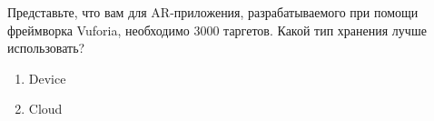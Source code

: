 
Представьте, что вам для AR-приложения, разрабатываемого при помощи фреймворка Vuforia, необходимо 3000 таргетов. Какой тип хранения лучше использовать?

\begin{enumerate}
    \item Device
    \item Cloud
\end{enumerate}

